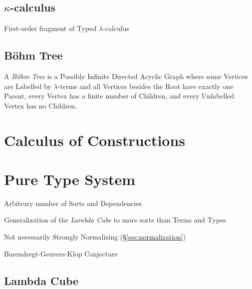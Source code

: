 \subsection{$\kappa$-calculus}\label{sec:kappa_calculus}

First-order fragment of Typed $\lambda$-calculus



\subsection{B\"ohm Tree}\label{sec:bohm_tree}

A \emph{B\"ohm Tree} is a Possibly Infinite Directed Acyclic Graph
where some Vertices are Labelled by $\lambda$-terms and all Vertices
besides the Root have exactly one Parent, every Vertex has a finite
number of Children, and every Unlabelled Vertex has no Children.



\section{Calculus of Constructions}\label{sec:coq}

\section{Pure Type System}\label{sec:pure_type_system}

Arbitrary number of Sorts and Dependencies

Generalization of the \emph{Lambda Cube} to more sorts than Terms and
Types

Not necessarily Strongly Normalizing (\S\ref{sec:normalization})

Barendregt-Geuvers-Klop Conjecture



\subsection{Lambda Cube}\label{sec:lambda_cube}

